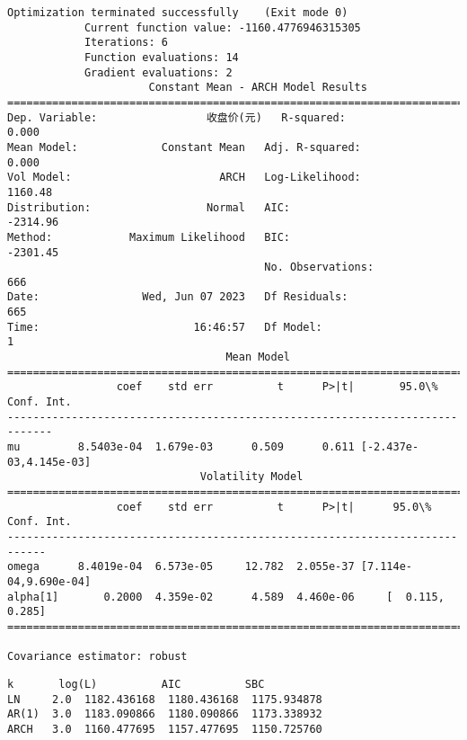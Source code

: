 \documentclass[11pt]{article}
\makeatletter
\newcommand{\boxspacing}{\kern\kvtcb@left@rule\kern\kvtcb@boxsep}
\newcommand{\prompt}[4]{
        {\ttfamily\llap{{\color{#2}[#3]:\hspace{3pt}#4}}\vspace{-\baselineskip}}
    }
\makeatother
\begin{document}
    \begin{Verbatim}[commandchars=\\\{\}]
Optimization terminated successfully    (Exit mode 0)
            Current function value: -1160.4776946315305
            Iterations: 6
            Function evaluations: 14
            Gradient evaluations: 2
                      Constant Mean - ARCH Model Results
==============================================================================
Dep. Variable:                 收盘价(元)   R-squared:                       0.000
Mean Model:             Constant Mean   Adj. R-squared:                  0.000
Vol Model:                       ARCH   Log-Likelihood:                1160.48
Distribution:                  Normal   AIC:                          -2314.96
Method:            Maximum Likelihood   BIC:                          -2301.45
                                        No. Observations:                  666
Date:                Wed, Jun 07 2023   Df Residuals:                      665
Time:                        16:46:57   Df Model:                            1
                                  Mean Model
=============================================================================
                 coef    std err          t      P>|t|       95.0\% Conf. Int.
-----------------------------------------------------------------------------
mu         8.5403e-04  1.679e-03      0.509      0.611 [-2.437e-03,4.145e-03]
                              Volatility Model
============================================================================
                 coef    std err          t      P>|t|      95.0\% Conf. Int.
----------------------------------------------------------------------------
omega      8.4019e-04  6.573e-05     12.782  2.055e-37 [7.114e-04,9.690e-04]
alpha[1]       0.2000  4.359e-02      4.589  4.460e-06     [  0.115,  0.285]
============================================================================

Covariance estimator: robust
    \end{Verbatim}

            \begin{tcolorbox}[breakable, size=fbox, boxrule=.5pt, pad at break*=1mm, opacityfill=0]
\prompt{Out}{outcolor}{51}{\boxspacing}
\begin{Verbatim}[commandchars=\\\{\}]
         k       log(L)          AIC          SBC
LN     2.0  1182.436168  1180.436168  1175.934878
AR(1)  3.0  1183.090866  1180.090866  1173.338932
ARCH   3.0  1160.477695  1157.477695  1150.725760
\end{Verbatim}
\end{tcolorbox}
\end{document}
